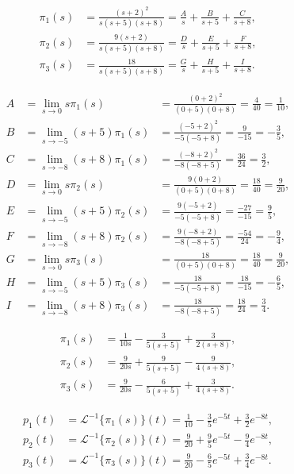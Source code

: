 \[
	\begin{aligned}
		\pi_1(s) & = \frac{(s+2)^2}{s(s+5)(s+8)} = \frac{A}{s} + \frac{B}{s+5} + \frac{C}{s+8}, \\
		\pi_2(s) & = \frac{9(s+2)}{s(s+5)(s+8)} = \frac{D}{s} + \frac{E}{s+5} + \frac{F}{s+8},  \\
		\pi_3(s) & = \frac{18}{s(s+5)(s+8)} = \frac{G}{s} + \frac{H}{s+5} + \frac{I}{s+8}.
	\end{aligned}
\]

\[
	\begin{aligned}
		A & = \lim_{s\rightarrow 0} s\pi_1(s)      & = \frac{(0+2)^2}{(0+5)(0+8)} = \frac{4}{40} = \frac{1}{10}, \\
		B & = \lim_{s\rightarrow -5} (s+5)\pi_1(s) & = \frac{(-5+2)^2}{-5(-5+8)} = \frac{9}{-15} = -\frac{3}{5}, \\
		C & = \lim_{s\rightarrow -8} (s+8)\pi_1(s) & = \frac{(-8+2)^2}{-8(-8+5)} = \frac{36}{24} = \frac{3}{2},  \\
		D & = \lim_{s\rightarrow 0} s\pi_2(s)      & = \frac{9(0+2)}{(0+5)(0+8)} = \frac{18}{40} = \frac{9}{20}, \\
		E & = \lim_{s\rightarrow -5} (s+5)\pi_2(s) & = \frac{9(-5+2)}{-5(-5+8)} = \frac{-27}{-15} = \frac{9}{5}, \\
		F & = \lim_{s\rightarrow -8} (s+8)\pi_2(s) & = \frac{9(-8+2)}{-8(-8+5)} = \frac{-54}{24} = -\frac{9}{4}, \\
		G & = \lim_{s\rightarrow 0} s\pi_3(s)      & = \frac{18}{(0+5)(0+8)} = \frac{18}{40} = \frac{9}{20},     \\
		H & = \lim_{s\rightarrow -5} (s+5)\pi_3(s) & = \frac{18}{-5(-5+8)} = \frac{18}{-15} = -\frac{6}{5},      \\
		I & = \lim_{s\rightarrow -8} (s+8)\pi_3(s) & = \frac{18}{-8(-8+5)} = \frac{18}{24} = \frac{3}{4}.
	\end{aligned}
\]

\[
	\begin{aligned}
		\pi_1(s) & = \frac{1}{10s} - \frac{3}{5(s+5)} + \frac{3}{2(s+8)}, \\
		\pi_2(s) & = \frac{9}{20s} + \frac{9}{5(s+5)} - \frac{9}{4(s+8)}, \\
		\pi_3(s) & = \frac{9}{20s} - \frac{6}{5(s+5)} + \frac{3}{4(s+8)}.
	\end{aligned}
\]

\[
	\begin{aligned}
		p_1(t) & = \mathcal{L}^{-1}\{\pi_1(s)\}(t)
		= \frac{1}{10} - \frac{3}{5}e^{-5t} + \frac{3}{2}e^{-8t}, \\
		p_2(t) & = \mathcal{L}^{-1}\{\pi_2(s)\}(t)
		= \frac{9}{20} + \frac{9}{5}e^{-5t} - \frac{9}{4}e^{-8t}, \\
		p_3(t) & = \mathcal{L}^{-1}\{\pi_3(s)\}(t)
		= \frac{9}{20} - \frac{6}{5}e^{-5t} + \frac{3}{4}e^{-8t}.
	\end{aligned}
\]

